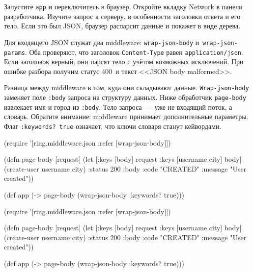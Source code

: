 Запустите \verb|app| и переключитесь в браузер. Откройте вкладку Network в
панели разработчика. Изучите запрос к серверу, в особенности заголовки ответа и
его тело. Если это был JSON, браузер распарсит данные и покажет в виде дерева.

Для входящего JSON служат два middleware: \verb|wrap-json-body|
и~\verb|wrap-json-params|. Оба проверяют, что заголовок \verb|Content-Type|
равен \verb|application/json|. Если заголовок верный, они парсят тело с учётом
возможных исключений. При ошибке разбора получим статус 400~и текст <<JSON body
malformed>>.

Разница между middleware в том, куда они складывают
данные. \verb|Wrap-json-body| заменяет поле \verb|:body| запроса на
структуру данных. Ниже обработчик \verb|page-body| извлекает имя и город из
\verb|:body|. Тело запроса~--- уже не входящий поток, а словарь. Обратите
внимание: middleware принимает дополнительные параметры. Флаг \verb|:keywords? true|
означает, что ключи словаря станут кейвордами.

\ifx\DEVICETYPE\MOBILE

\begin{english}
  \begin{clojure}
(require '[ring.middleware.json
           :refer [wrap-json-body]])

(defn page-body [request]
  (let [{:keys [body]} request
        {:keys [username city]} body]
    (create-user username city)
    {:status 200
     :body {:code "CREATED"
            :message "User created"}}))

(def app
  (->
    page-body
    (wrap-json-body {:keywords? true})))
  \end{clojure}
\end{english}

\else

\begin{english}
  \begin{clojure}
(require '[ring.middleware.json :refer [wrap-json-body]])

(defn page-body [request]
  (let [{:keys [body]} request
        {:keys [username city]} body]
    (create-user username city)
    {:status 200
     :body {:code "CREATED"
            :message "User created"}}))

(def app (-> page-body
             (wrap-json-body {:keywords? true})))
  \end{clojure}
\end{english}

\fi

